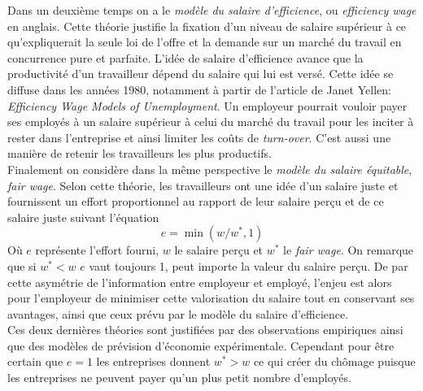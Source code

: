 \documentclass[main.tex]{subfiles}
\begin{document}
        Dans un deuxième temps on a le \emph{modèle du salaire d'efficience}, ou \emph{efficiency wage} en anglais. Cette théorie justifie la fixation d'un niveau de salaire supérieur à ce qu'expliquerait la seule loi de l'offre et la demande sur un marché du travail en concurrence pure et parfaite. L'idée de salaire d'efficience avance que la productivité d'un travailleur dépend du salaire qui lui est versé. Cette idée se diffuse dans les années 1980, notamment à partir de l'article de Janet Yellen: \textit{Efficiency Wage Models of Unemployment}. Un employeur pourrait vouloir payer ses employés à un salaire supérieur à celui du marché du travail pour les inciter à rester dans l'entreprise et ainsi limiter les coûts de \emph{turn-over}. C'est aussi une manière de retenir les travailleurs les plus productifs. \\
        Finalement on considère dans la même perspective le \emph{modèle du salaire équitable}, \emph{fair wage}. Selon cette théorie, les travailleurs ont une idée d'un salaire juste et fournissent un effort proportionnel au rapport de leur salaire perçu et de ce salaire juste suivant l'équation
        \begin{equation}
                e = \min(w/w^{*}, 1) 
        \end{equation}
        Où $e$ représente l'effort fourni, $w$ le salaire perçu et $w^{*}$ le \emph{fair wage}. On remarque que si $w^{*} < w$ $e$ vaut toujours 1, peut importe la valeur du salaire perçu. De par cette asymétrie de l'information entre employeur et employé, l'enjeu est alors pour l'employeur de minimiser cette valorisation du salaire tout en conservant ses avantages, ainsi que ceux prévu par le modèle du salaire d'efficience. \\
        Ces deux dernières théories sont justifiées par des observations empiriques ainsi que des modèles de prévision d'économie expérimentale. Cependant pour être certain que $e = 1$ les entreprises donnent $w^{*} > w$ ce qui créer du chômage puisque les entreprises ne peuvent payer qu'un plus petit nombre d'employés. 
\end{document}

